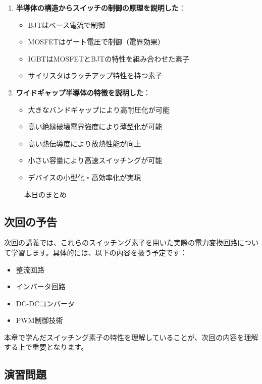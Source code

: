 \begin{enumerate}
\item \textbf{半導体の構造からスイッチの制御の原理を説明した}：
\begin{itemize}
\item BJTはベース電流で制御
\item MOSFETはゲート電圧で制御（電界効果）
\item IGBTはMOSFETとBJTの特性を組み合わせた素子
\item サイリスタはラッチアップ特性を持つ素子
\end{itemize}

\item \textbf{ワイドギャップ半導体の特徴を説明した}：
\begin{itemize}
\item 大きなバンドギャップにより高耐圧化が可能
\item 高い絶縁破壊電界強度により薄型化が可能
\item 高い熱伝導度により放熱性能が向上
\item 小さい容量により高速スイッチングが可能
\item デバイスの小型化・高効率化が実現
\end{itemize}
\end{enumerate}

\begin{figure}[H]
\centering
{}
\caption{本日のまとめ}
\label{fig:summary}
\end{figure}

\subsection{次回の予告}

次回の講義では、これらのスイッチング素子を用いた実際の電力変換回路について学習します。具体的には、以下の内容を扱う予定です：

\begin{itemize}
\item 整流回路
\item インバータ回路
\item DC-DCコンバータ
\item PWM制御技術
\end{itemize}

本章で学んだスイッチング素子の特性を理解していることが、次回の内容を理解する上で重要となります。

\subsection{演習問題}


